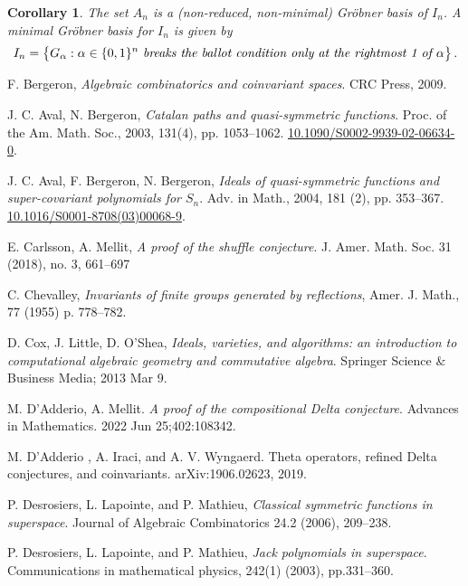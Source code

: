 \documentclass[11pt]{amsart}
\newtheorem{cor}[theorem]{Corollary}
\theoremstyle{definition}
\numberwithin{equation}{section}
\begin{document}
\begin{cor}\label{cor:minimalGB}
The set $A_n$ is a (non-reduced, non-minimal) Gr\"obner basis of $I_n$. A minimal Gr\"obner basis for $I_n$ is given by
$$ I_n =\big\{ G_\alpha : \alpha \in \{0,1\}^n \text{ \it breaks the ballot condition only
at the rightmost  1 of }  \alpha\big\}\,.
$$
\end{cor}


\vskip 1in

\begin{thebibliography}{999}

 F. Bergeron,
\textit{Algebraic combinatorics and coinvariant spaces}.
CRC Press, 2009.

 J. C. Aval, N. Bergeron,
\textit{Catalan paths and quasi-symmetric functions}.
Proc. of the Am. Math. Soc., 2003, 131(4), pp. 1053--1062.
\href{https://doi.org/10.1090/S0002-9939-02-06634-0}{10.1090/S0002-9939-02-06634-0}.

 J. C. Aval, F. Bergeron, N. Bergeron,
\textit{Ideals of quasi-symmetric functions and super-covariant polynomials for $S_n$}.
Adv. in Math., 2004, 181 (2), pp. 353--367.
\href{https://doi.org/10.1016/S0001-8708(03)00068-9}{10.1016/S0001-8708(03)00068-9}.

 E. Carlsson, A. Mellit,
\textit{A proof of the shuffle conjecture}.
J. Amer. Math. Soc. 31 (2018), no. 3, 661–697

 C. Chevalley,
\textit {Invariants of finite groups generated by reflections},
Amer. J. Math., 77 (1955) p. 778--782.


 D. Cox, J. Little, D. O'Shea,
\textit{Ideals, varieties, and algorithms: an introduction to computational
algebraic geometry and commutative algebra}.
Springer Science \& Business Media; 2013 Mar 9.

 M. D'Adderio, A. Mellit.
\textit{A proof of the compositional Delta conjecture}.
Advances in Mathematics. 2022 Jun 25;402:108342.

 M. D'Adderio , A. Iraci, and A. V. Wyngaerd.
Theta operators, refined Delta conjectures, and
coinvariants. arXiv:1906.02623, 2019.

 P. Desrosiers, L. Lapointe, and P. Mathieu,
\textit{Classical symmetric functions in superspace}.
Journal of Algebraic Combinatorics 24.2 (2006), 209--238.

 P. Desrosiers, L. Lapointe, and P. Mathieu,
\textit{Jack polynomials in superspace}.
Communications in mathematical physics, 242(1) (2003), pp.331--360.


\end{thebibliography}
\end{document}
